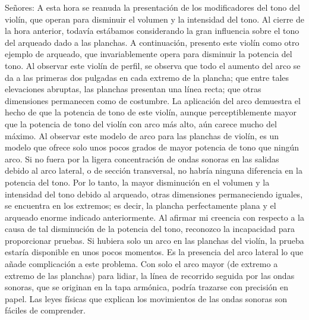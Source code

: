 \documentclass[12pt]{book}
\begin{document}
Señores: A esta hora se reanuda la presentación de los modificadores del tono del violín, que operan para disminuir el volumen y la intensidad del tono. Al cierre de la hora anterior, todavía estábamos considerando la gran influencia sobre el tono del arqueado dado a las planchas. A continuación, presento este violín como otro ejemplo de arqueado, que invariablemente opera para disminuir la potencia del tono. Al observar este violín de perfil, se observa que todo el aumento del arco se da a las primeras dos pulgadas en cada extremo de la plancha; que entre tales elevaciones abruptas, las planchas presentan una línea recta; que otras dimensiones permanecen como de costumbre. La aplicación del arco demuestra el hecho de que la potencia de tono de este violín, aunque perceptiblemente mayor que la potencia de tono del violín con arco más alto, aún carece mucho del máximo. Al observar este modelo de arco para las planchas de violín, es un modelo que ofrece solo unos pocos grados de mayor potencia de tono que ningún arco. Si no fuera por la ligera concentración de ondas sonoras en las salidas debido al arco lateral, o de sección transversal, no habría ninguna diferencia en la potencia del tono. Por lo tanto, la mayor disminución en el volumen y la intensidad del tono debido al arqueado, otras dimensiones permaneciendo iguales, se encuentra en los extremos; es decir, la plancha perfectamente plana y el arqueado enorme indicado anteriormente. Al afirmar mi creencia con respecto a la causa de tal disminución de la potencia del tono, reconozco la incapacidad para proporcionar pruebas. Si hubiera solo un arco en las planchas del violín, la prueba estaría disponible en unos pocos momentos. Es la presencia del arco lateral lo que añade complicación a este problema. Con solo el arco mayor (de extremo a extremo de las planchas) para lidiar, la línea de recorrido seguida por las ondas sonoras, que se originan en la tapa armónica, podría trazarse con precisión en papel. Las leyes físicas que explican los movimientos de las ondas sonoras son fáciles de comprender.
\end{document}
